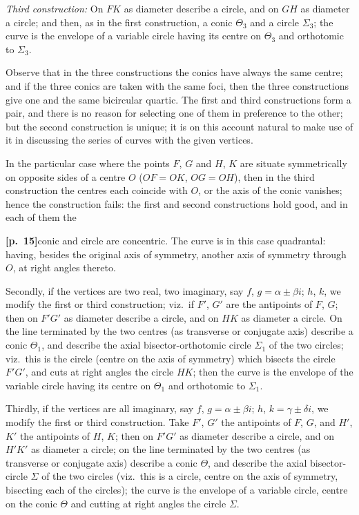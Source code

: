 \documentclass[11pt,a4paper]{article}
\begin{document}
\medskip

\noindent\textit{Third construction:} On $FK$ as diameter describe a circle, and on $GH$ as diameter a circle; and then, as in the first construction, a conic $\Theta_{3}$ and a circle $\Sigma_{3}$; the curve is the envelope of a variable circle having its centre on $\Theta_{3}$ and orthotomic to $\Sigma_{3}$.

\medskip

Observe that in the three constructions the conics have always the same centre; and if the three conics are taken with the same foci, then the three constructions give one and the same bicircular quartic. The first and third constructions form a pair, and there is no reason for selecting one of them in preference to the other; but the second construction is unique; it is on this account natural to make use of it in discussing the series of curves with the given vertices.

\medskip

In the particular case where the points $F$, $G$ and $H$, $K$ are situate symmetrically on opposite sides of a centre $O$ ($OF = OK$, $OG = OH$), then in the third construction the centres each coincide with $O$, or the axis of the conic vanishes; hence the construction fails: the first and second constructions hold good, and in each of them the

\bigskip

\noindent\textbf{[p.~15]}\quad conic and circle are concentric. The curve is in this case quadrantal: having, besides the original axis of symmetry, another axis of symmetry through $O$, at right angles thereto.

\medskip

Secondly, if the vertices are two real, two imaginary, say $f$, $g = \alpha \pm \beta i$; $h$, $k$, we modify the first or third construction; viz.\ if $F'$, $G'$ are the antipoints of $F$, $G$; then on $F'G'$ as diameter describe a circle, and on $HK$ as diameter a circle. On the line terminated by the two centres (as transverse or conjugate axis) describe a conic $\Theta_{1}$, and describe the axial bisector-orthotomic circle $\Sigma_{1}$ of the two circles; viz.\ this is the circle (centre on the axis of symmetry) which bisects the circle $F'G'$, and cuts at right angles the circle $HK$; then the curve is the envelope of the variable circle having its centre on $\Theta_{1}$ and orthotomic to $\Sigma_{1}$.

\medskip

Thirdly, if the vertices are all imaginary, say $f$, $g = \alpha \pm \beta i$; $h$, $k = \gamma \pm \delta i$, we modify the first or third construction. Take $F'$, $G'$ the antipoints of $F$, $G$, and $H'$, $K'$ the antipoints of $H$, $K$; then on $F'G'$ as diameter describe a circle, and on $H'K'$ as diameter a circle; on the line terminated by the two centres (as transverse or conjugate axis) describe a conic $\Theta$, and describe the axial bisector-circle $\Sigma$ of the two circles (viz.\ this is a circle, centre on the axis of symmetry, bisecting each of the circles); the curve is the envelope of a variable circle, centre on the conic $\Theta$ and cutting at right angles the circle $\Sigma$.
\end{document}
